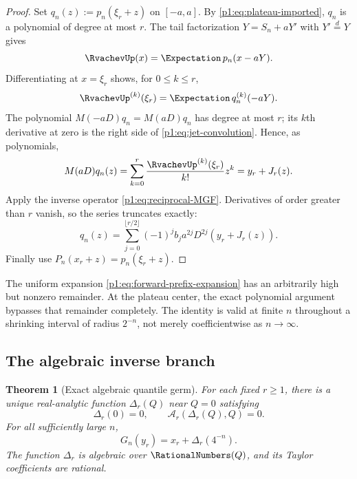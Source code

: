 \documentclass[11pt,oneside]{article}
\numberwithin{equation}{section}
\newtheorem{theorem}{Theorem}[section]
\theoremstyle{definition}
\theoremstyle{remark}
\newcommand{\Fn}{P_n}
\begin{document}
\begin{proof}
Set $q_n(z):=p_n(\xi_r+z)$ on $[-a,a]$.  By
\eqref{p1:eq:plateau-imported}, $q_n$ is a polynomial of degree at most $r$.
The tail factorization $Y=S_n+aY'$ with $Y'\stackrel d=Y$ gives
\begin{equation}
 \RvachevUp(x)=\Expectation\,p_n(x-aY).
 \label{p1:eq:convolution-expectation}
\end{equation}
Differentiating at $x=\xi_r$ shows, for $0\le k\le r$,
\begin{equation}
 \RvachevUp^{(k)}(\xi_r)=\Expectation\,q_n^{(k)}(-aY).
 \label{p1:eq:jet-convolution}
\end{equation}
The polynomial $M(-aD)q_n=M(aD)q_n$ has degree at most $r$; its $k$th
derivative at zero is the right side of \eqref{p1:eq:jet-convolution}.  Hence, as
polynomials,
\begin{equation}
 M(aD)q_n(z)=
 \sum_{k=0}^{r}\frac{\RvachevUp^{(k)}(\xi_r)}{k!}z^k
 =y_r+J_r(z).
 \label{p1:eq:polynomial-smoothing}
\end{equation}
Apply the inverse operator \eqref{p1:eq:reciprocal-MGF}.  Derivatives of order greater
than $r$ vanish, so the series truncates exactly:
\[
 q_n(z)=\sum_{j=0}^{\lfloor r/2\rfloor}
 (-1)^jb_ja^{2j}D^{2j}(y_r+J_r(z)).
\]
Finally use $\Fn(x_r+z)=p_n(\xi_r+z)$.
\end{proof}

\begin{remark}
The uniform expansion \eqref{p1:eq:forward-prefix-expansion} has an arbitrarily high but
nonzero remainder.  At the plateau center, the exact polynomial argument bypasses that
remainder completely.  The identity is valid at finite $n$ throughout a shrinking interval
of radius $2^{-n}$, not merely coefficientwise as $n\to\infty$.
\end{remark}

\subsection{The algebraic inverse branch}

\begin{theorem}[Exact algebraic quantile germ]
\label{p1:thm:algebraic-germ}
For each fixed $r\ge1$, there is a unique real-analytic function $\Delta_r(Q)$ near
$Q=0$ satisfying
\begin{equation}
 \Delta_r(0)=0,
 \qquad
 \mathcal A_r(\Delta_r(Q),Q)=0.
 \label{p1:eq:Delta-implicit}
\end{equation}
For all sufficiently large $n$,
\begin{equation}
 \boxed{
 G_n(y_r)=x_r+\Delta_r(4^{-n}).}
 \label{p1:eq:exact-quantile-germ}
\end{equation}
The function $\Delta_r$ is algebraic over $\RationalNumbers(Q)$, and its Taylor coefficients are
rational.
\end{theorem}
\end{document}
